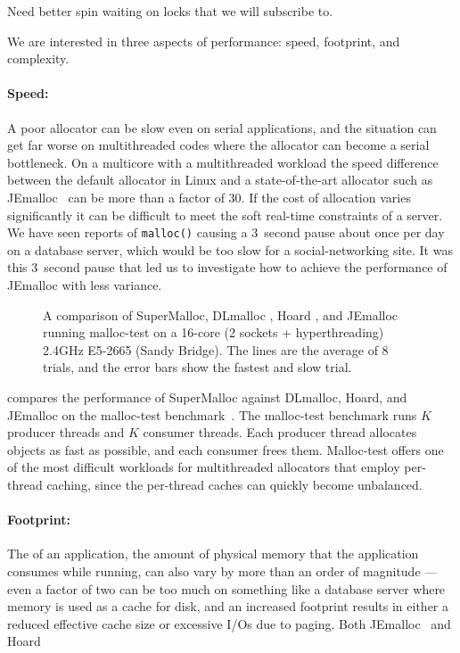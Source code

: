 \documentclass[pldi]{sigplanconf-pldi15}
\newcommand{\code}[1]{\texttt{#1}}
\begin{document}
Need better spin waiting on locks that we will subscribe to.


We are interested in three aspects of performance: speed, footprint, and complexity.

{\paragraph{Speed:}} A poor allocator can be slow even on serial
applications, and the situation can get far worse on multithreaded
codes where the allocator can become a serial bottleneck.  On a
multicore with a multithreaded workload the speed difference between
the default allocator in Linux \cite{Lea96} and a state-of-the-art
allocator such as JEmalloc~\cite{Evans06} can be more than a factor of
30.  If the cost of allocation varies significantly it can be
difficult to meet the soft real-time constraints of a server.  We have
seen reports of \code{malloc()} causing a 3~second pause about once
per day on a database server, which would be too slow for a
social-networking site.  It was this 3~second pause that led us to
investigate how to achieve the performance of JEmalloc with less
variance.

\begin{figure}

\caption{A comparison of SuperMalloc, DLmalloc \cite{Lea96}, Hoard
  \cite{BergerMcBl00}, and JEmalloc~\cite{Evans06} running malloc-test
  on a 16-core (2 sockets + hyperthreading) 2.4GHz E5-2665 (Sandy
  Bridge).  The lines are the average of 8 trials, and the error bars
  show the fastest and slow trial.}
\label{fig:data}
\vspace*{-3ex}
\end{figure}

 compares the performance of SuperMalloc against
DLmalloc, Hoard, and JEmalloc on the malloc-test
benchmark~\cite{LeverBo00}.  The malloc-test benchmark runs $K$
producer threads and $K$ consumer threads.  Each producer thread
allocates objects as fast as possible, and each consumer frees them.
Malloc-test offers one of the most difficult workloads for
multithreaded allocators that employ per-thread caching, since the
per-thread caches can quickly become unbalanced.

{\paragraph{Footprint:}} The  of an
application, the amount of physical memory that the application
consumes while running, can also vary by more than an order of
magnitude --- even a factor of two can be too much on something like a
database server where memory is used as a cache for disk, and an
increased footprint results in either a reduced effective cache size
or excessive I/Os due to paging.  Both JEmalloc~\cite{Evans06} and Hoard~\cite{BergerMcBl00} 
\end{document}
